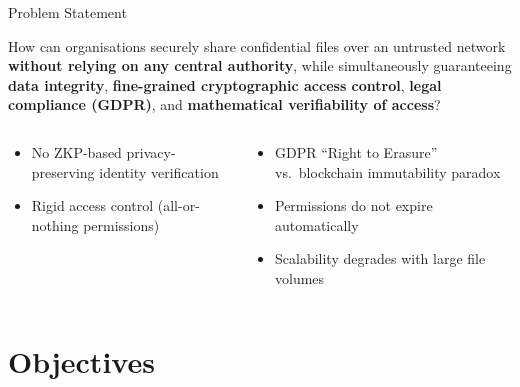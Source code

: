 \documentclass[aspectratio=169]{beamer}
\begin{document}
\begin{frame}{Problem Statement}
\begin{tcolorbox}[redbox, title={\textbf{Problem Statement}}]
\small
How can organisations securely share confidential files over an untrusted network
\textbf{without relying on any central authority}, while simultaneously guaranteeing
\textbf{data integrity}, \textbf{fine-grained cryptographic access control},
\textbf{legal compliance (GDPR)}, and \textbf{mathematical verifiability of access}?
\end{tcolorbox}
\vspace{0.2cm}
\begin{columns}[t]
\begin{tcolorbox}[bluebox, title=\textbf{What Existing Solutions Miss}]
\small
\begin{itemize}
  \item No ZKP-based privacy-preserving identity verification
  \item Rigid access control (all-or-nothing permissions)
\end{itemize}
\end{tcolorbox}
\begin{tcolorbox}[greenbox, title=\textbf{What Existing Solutions Miss}]
\small
\begin{itemize}
  \item GDPR ``Right to Erasure'' vs.\ blockchain immutability paradox
  \item Permissions do not expire automatically
  \item Scalability degrades with large file volumes
\end{itemize}
\end{tcolorbox}
\end{columns}
\end{frame}

\section{Objectives}
\end{document}
